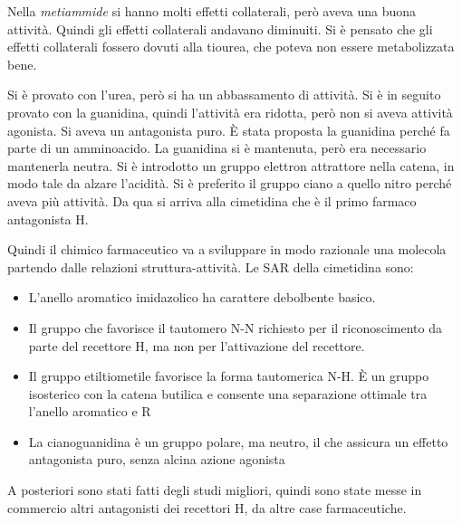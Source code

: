 \clearpage

Nella \emph{metiammide} si hanno molti effetti collaterali, però aveva una
buona attività. Quindi gli effetti collaterali andavano diminuiti. Si è
pensato che gli effetti collaterali fossero dovuti alla tiourea, che
poteva non essere metabolizzata bene.

Si è provato con l'urea, però si ha un abbassamento di attività. Si è in
seguito provato con la guanidina, quindi l'attività era ridotta, però
non si aveva attività agonista. Si aveva un antagonista puro. È stata
proposta la guanidina perché fa parte di un amminoacido. La guanidina si
è mantenuta, però era necessario mantenerla neutra.
Si è introdotto un gruppo elettron attrattore nella catena, in modo tale
da alzare l'acidità. Si è preferito il gruppo ciano a quello nitro
perché aveva più attività.
Da qua si arriva alla cimetidina che è il primo farmaco antagonista H.


Quindi il chimico farmaceutico va a sviluppare in modo razionale una
molecola partendo dalle relazioni struttura-attività.
Le SAR della cimetidina sono:
\begin{itemize}
  \item L'anello aromatico imidazolico ha carattere debolbente basico.
  \item Il gruppo  che favorisce il tautomero N\ped{\tau}-N  richiesto per il riconoscimento da parte del recettore H, ma non per l'attivazione del recettore.
  \item Il gruppo etiltiometile favorisce la forma tautomerica N\ped{\tau}-H. È un gruppo isosterico con la catena butilica e consente una separazione ottimale tra l'anello aromatico e R
  \item La cianoguanidina è un gruppo polare, ma neutro, il che assicura un effetto antagonista puro, senza alcina azione agonista
\end{itemize}



A posteriori sono stati fatti degli studi migliori, quindi sono state
messe in commercio altri antagonisti dei recettori H, da altre case
farmaceutiche.

